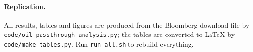 \documentclass[11pt,a4paper]{article}
\begin{document}
\begin{table}[!htbp]
\centering\small
\caption{Robustness of market sensitivities to data frequency (bp per 10\% Brent move)}\label{tab:robmkt}
\begin{minipage}{\textwidth}\centering

\par{}
\end{minipage}
\end{table}

\paragraph{Replication.} All results, tables and figures are produced from the Bloomberg download file by\\ \texttt{code/oil\_passthrough\_analysis.py}; the tables are converted to \LaTeX{} by \texttt{code/make\_tables.py}. Run \texttt{run\_all.sh} to rebuild everything.
\end{document}
